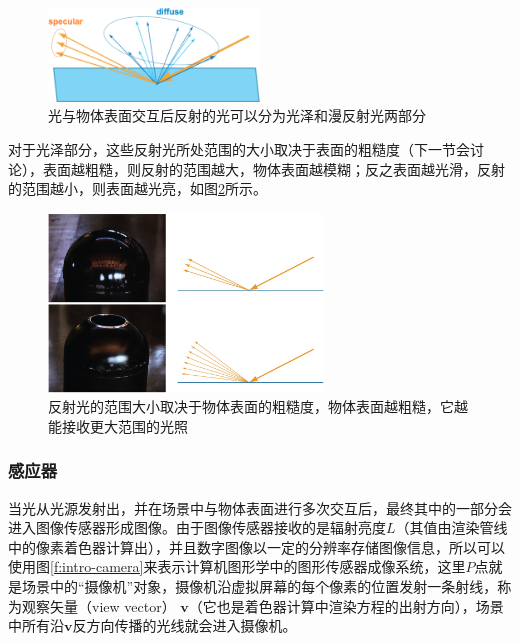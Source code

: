 \begin{figure}
\sidecaption
	\includegraphics[width=0.5\textwidth]{figures/intro/ray-optics-6}
	\caption{光与物体表面交互后反射的光可以分为光泽和漫反射光两部分}
	\label{f:intro-specular-and-diffuse}
\end{figure}

对于光泽部分，这些反射光所处范围的大小取决于表面的粗糙度（下一节会讨论），表面越粗糙，则反射的范围越大，物体表面越模糊；反之表面越光滑，反射的范围越小，则表面越光亮，如图\ref{f:intro-roughness}所示。

\begin{figure}
\sidecaption
	\includegraphics[width=0.65\textwidth]{figures/intro/ray-optics-2}
	\caption{反射光的范围大小取决于物体表面的粗糙度，物体表面越粗糙，它越能接收更大范围的光照}
	\label{f:intro-roughness}
\end{figure}




\subsubsection{感应器}\label{sec:intro-sensor}
当光从光源发射出，并在场景中与物体表面进行多次交互后，最终其中的一部分会进入图像传感器形成图像。由于图像传感器接收的是辐射亮度$L$（其值由渲染管线中的像素着色器计算出），并且数字图像以一定的分辨率存储图像信息，所以可以使用图\ref{f:intro-camera}来表示计算机图形学中的图形传感器成像系统，这里$P$点就是场景中的“摄像机”对象，摄像机沿虚拟屏幕的每个像素的位置发射一条射线，称为观察矢量（view vector） $\mathbf{v}$（它也是着色器计算中渲染方程的出射方向），场景中所有沿$\mathbf{v}$反方向传播的光线就会进入摄像机。

